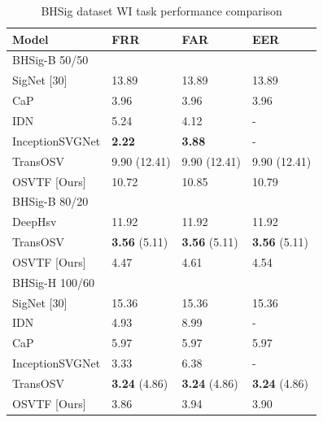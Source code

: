 \begin{table}[H]
\caption{BHSig dataset WI task performance comparison}  
\begin{center}
\begin{tabu} to 0.8\textwidth{X[3, l]X[2, l]X[2, l]X[2, l]}  
\toprule
Model & FRR & FAR & EER \\
\midrule
BHSig-B 50/50\\
SigNet [30] & 13.89 & 13.89 & 13.89 \\
CaP \cite{25} & 3.96 & 3.96 & 3.96 \\
IDN \cite{37}	& 5.24 & 4.12 & - \\
InceptionSVGNet \cite{27} & \textbf{2.22} & \textbf{3.88} & - \\
TransOSV \cite{41} & 9.90 (12.41) & 9.90 (12.41) & 9.90 (12.41)\\
OSVTF [Ours] & 10.72 & 10.85 & 10.79 \\
\midrule
BHSig-B 80/20 \\
DeepHsv \cite{21} & 11.92 & 11.92 & 11.92 \\
TransOSV \cite{41} & \textbf{3.56} (5.11) & \textbf{3.56} (5.11) & \textbf{3.56} (5.11) \\
OSVTF [Ours] & 4.47 & 4.61 & 4.54 \\
\midrule
BHSig-H 100/60 \\
SigNet [30] & 15.36 & 15.36 & 15.36 \\
IDN \cite{37} & 4.93 & 8.99 & - \\
CaP \cite{25} & 5.97 & 5.97 & 5.97 \\
InceptionSVGNet \cite{27} & 3.33 & 6.38 & - \\
TransOSV \cite{41} & \textbf{3.24} (4.86) & \textbf{3.24} (4.86)& \textbf{3.24} (4.86)\\
OSVTF [Ours] & 3.86 & 3.94 & 3.90 \\
\bottomrule
\end{tabu}
\end{center}
\label{tab:wi}
\end{table}

